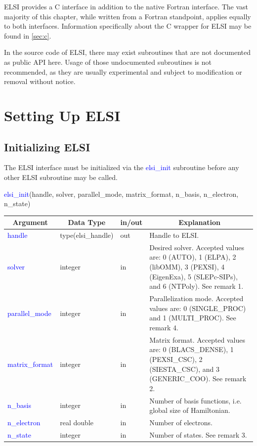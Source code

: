 \documentclass{report}
\begin{document}
ELSI provides a C interface in addition to the native Fortran interface. The vast majority of this chapter, while written from a Fortran standpoint, applies equally to both interfaces. Information specifically about the C wrapper for ELSI may be found in \ref{sec:c}.

In the source code of ELSI, there may exist subroutines that are not documented as public API here. Usage of those undocumented subroutines is not recommended, as they are usually experimental and subject to modification or removal without notice.

\section{Setting Up ELSI}
\label{sec:setup}
\subsection{Initializing ELSI}
\label{subsec:setup_init}
The ELSI interface must be initialized via the \textcolor{blue}{elsi\_init} subroutine before any other ELSI subroutine may be called.
\begin{labeling}{\hspace{6cm}}
\item [\hspace{0.3cm} \textcolor{blue}{elsi\_init}(handle, solver, parallel\_mode, matrix\_format, n\_basis, n\_electron, n\_state)]
\end{labeling}

\begin{tabular}[]{|p{30mm}|p{30mm}|p{15mm}|p{90mm}|}
\hline
\multicolumn{1}{|c|}{\textbf{Argument}} & \multicolumn{1}{c|}{\textbf{Data Type}} & \multicolumn{1}{c|}{\textbf{in/out}} & \multicolumn{1}{c|}{\textbf{Explanation}}\\
\hline
\textcolor{blue}{handle}         & type(elsi\_handle) & out & Handle to ELSI.\\
\hline
\textcolor{blue}{solver}         & integer            & in  & Desired solver. Accepted values are: 0 (AUTO), 1 (ELPA), 2 (libOMM), 3 (PEXSI), 4 (EigenExa), 5 (SLEPc-SIPs), and 6 (NTPoly). See remark 1.\\
\hline
\textcolor{blue}{parallel\_mode} & integer            & in  & Parallelization mode. Accepted values are: 0 (SINGLE\_PROC) and 1 (MULTI\_PROC). See remark 4.\\
\hline
\textcolor{blue}{matrix\_format} & integer            & in  & Matrix format. Accepted values are: 0 (BLACS\_DENSE), 1 (PEXSI\_CSC), 2 (SIESTA\_CSC), and 3 (GENERIC\_COO). See remark 2.\\
\hline
\textcolor{blue}{n\_basis}       & integer            & in  & Number of basis functions, i.e. global size of Hamiltonian.\\
\hline
\textcolor{blue}{n\_electron}    & real double        & in  & Number of electrons.\\
\hline
\textcolor{blue}{n\_state}       & integer            & in  & Number of states. See remark 3.\\
\hline
\end{tabular}
\end{document}
